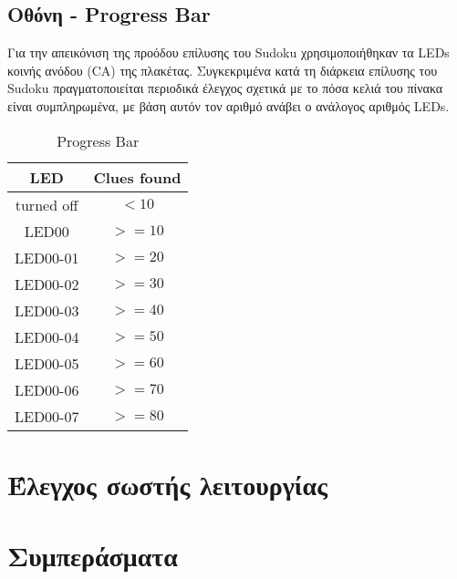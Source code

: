 \documentclass[a4paper,12pt]{article}
\begin{document}
\subsection{Οθόνη - Progress Bar}
Για την απεικόνιση της προόδου επίλυσης του Sudoku χρησιμοποιήθηκαν τα LEDs κοινής ανόδου (CA) της πλακέτας. Συγκεκριμένα κατά τη διάρκεια επίλυσης του Sudoku πραγματοποιείται περιοδικά έλεγχος σχετικά με το πόσα κελιά του πίνακα είναι συμπληρωμένα, με βάση αυτόν τον αριθμό ανάβει ο ανάλογος αριθμός LEDs.

\begin{table}[h!]
\centering
\begin{tabular}[c]{| c | c |}
\hline
LED & Clues found \\
\hline
turned off & $<10$ \\
\hline
LED00 &  $>=10$ \\
\hline
LED00-01 & $>=20$ \\
\hline
LED00-02 & $>=30$ \\
\hline
LED00-03 & $>=40$ \\
\hline
LED00-04 & $>=50$ \\
\hline
LED00-05 & $>=60$ \\
\hline
LED00-06 & $>=70$ \\
\hline
LED00-07 & $>=80$ \\
\hline
\end{tabular}
\caption{Progress Bar}
\end{table}







\section{Έλεγχος σωστής λειτουργίας}



\section{Συμπεράσματα}
\end{document}
